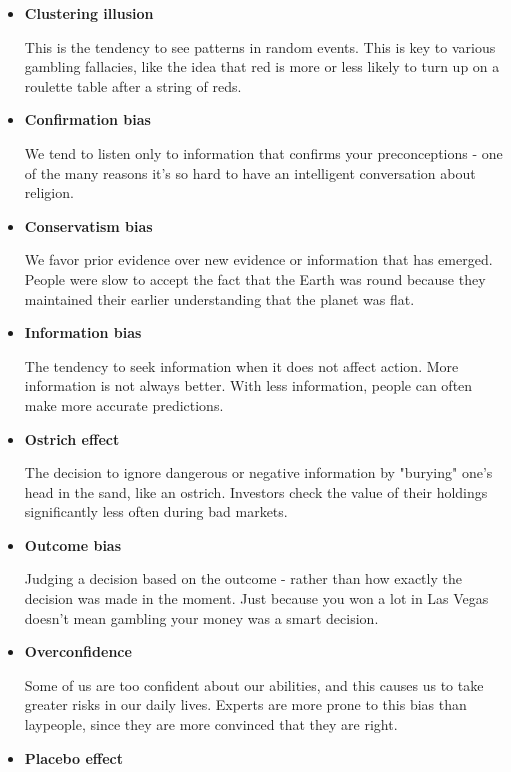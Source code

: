 \begin{itemize}
    \item \textbf{Clustering illusion}
    
    This is the tendency to see patterns in random events.  This is key to various gambling fallacies, like the idea that red is more or less likely to turn up on a roulette table after a string of reds.
    
    \item \textbf{Confirmation bias}
    
    We tend to listen only to information that confirms your preconceptions - one of the many reasons it's so hard to have an intelligent conversation about religion.
    
    \item \textbf{Conservatism bias}
    
    We favor prior evidence over new evidence or information that has emerged.  People were slow to accept the fact that the Earth was round because they maintained their earlier understanding that the planet was flat.
    
    \item \textbf{Information bias}
    
    The tendency to seek information when it does not affect action.  More information is not always better.  With less information, people can often make more accurate predictions.
    
    \item \textbf{Ostrich effect}
    
    The decision to ignore dangerous or negative information by "burying" one's head in the sand, like an ostrich.  Investors check the value of their holdings significantly less often during bad markets.
    
    \item \textbf{Outcome bias}
    
    Judging a decision based on the outcome - rather than how exactly the decision was made in the moment.  Just because you won a lot in Las Vegas doesn't mean gambling your money was a smart decision.
    
    \item \textbf{Overconfidence}
    
    Some of us are too confident about our abilities, and this causes us to take greater risks in our daily lives.  Experts are more prone to this bias than laypeople, since they are more convinced that they are right.
    
    \item \textbf{Placebo effect}
    

\end{itemize}
